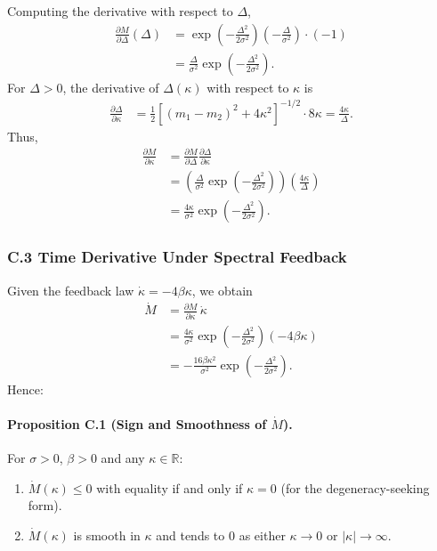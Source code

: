 \documentclass[11pt]{article}
\begin{document}
Computing the derivative with respect to $\Delta$,
\begin{align}
  \frac{\partial M}{\partial \Delta}(\Delta)
  &= \exp\left(-\frac{\Delta^2}{2\sigma^2}\right)
     \left(-\frac{\Delta}{\sigma^2}\right)
     \cdot (-1)\\
  &= \frac{\Delta}{\sigma^2}
     \exp\left(-\frac{\Delta^2}{2\sigma^2}\right).
\end{align}
For $\Delta>0$, the derivative of $\Delta(\kappa)$ with respect to $\kappa$ is
\begin{align}
  \frac{\partial \Delta}{\partial \kappa}
  &= \frac{1}{2}\left[(m_1 - m_2)^2 + 4\kappa^2\right]^{-1/2} \cdot 8\kappa
   = \frac{4\kappa}{\Delta}.
\end{align}
Thus,
\begin{align}
  \frac{\partial M}{\partial \kappa}
  &= \frac{\partial M}{\partial \Delta}
     \frac{\partial \Delta}{\partial \kappa}\\
  &= \left(
       \frac{\Delta}{\sigma^2}
       \exp\left(-\frac{\Delta^2}{2\sigma^2}\right)
     \right)
     \left(
       \frac{4\kappa}{\Delta}
     \right)\\
  &= \frac{4\kappa}{\sigma^2}
     \exp\left(-\frac{\Delta^2}{2\sigma^2}\right).
\end{align}

\subsubsection*{C.3 Time Derivative Under Spectral Feedback}

Given the feedback law $\dot\kappa = -4\beta\kappa$, we obtain
\begin{align}
  \dot M
  &= \frac{\partial M}{\partial \kappa}\,\dot\kappa\\
  &= \frac{4\kappa}{\sigma^2}
     \exp\left(-\frac{\Delta^2}{2\sigma^2}\right)
     (-4\beta\kappa)\\
  &= -\frac{16\beta\kappa^2}{\sigma^2}
      \exp\left(-\frac{\Delta^2}{2\sigma^2}\right).
\end{align}
Hence:

\paragraph{Proposition C.1 (Sign and Smoothness of \texorpdfstring{$\dot M$}{dot M}).}
For $\sigma>0$, $\beta>0$ and any $\kappa\in\mathbb{R}$:
\begin{enumerate}
  \item $\dot M(\kappa) \le 0$ with equality if and only if $\kappa=0$ (for the degeneracy-seeking form).
  \item $\dot M(\kappa)$ is smooth in $\kappa$ and tends to $0$ as either $\kappa\to 0$ or $|\kappa|\to\infty$.
\end{enumerate}
\end{document}
